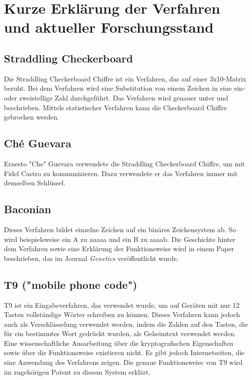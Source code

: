 \documentclass[fontsize=11pt, paper=a4, parskip=half]{scrartcl}
\begin{document}
\section{Kurze Erklärung der Verfahren und aktueller Forschungsstand}
\subsection{Straddling Checkerboard}
Die Straddling Checkerboard Chiffre ist ein Verfahren, das auf einer 3x10-Matrix beruht. Bei dem Verfahren wird eine Substitution von einem Zeichen in eine ein- oder zweistellige Zahl durchgeführt. Das Verfahren wird genauer unter \cite{Kuhlemann2020SpionageChiffreStraddlingCheckerboard} und \cite{Goebel2020TheRiseOfFieldCiphers} beschrieben. Mittels statistischer Verfahren kann die Checkerboard Chiffre gebrochen werden. \cite{Lyons2012CryptanalysisOfTheSimpleSubstitutionCipher}
\subsection{Ché Guevara}
Ernesto "Che" Guevara verwendete die Straddling Checkerboard Chiffre, um mit Fidel Castro zu kommunizieren. Dazu verwendete er das Verfahren immer mit demselben Schlüssel. \cite{Kuhlemann2020CheGuevaraChiffre}
\subsection{Baconian}
Dieses Verfahren bildet einzelne Zeichen auf ein binäres Zeichensystem ab. So wird beispielsweise ein A zu aaaaa und ein B zu aaaab. Die Geschichte hinter dem Verfahren sowie eine Erklärung der Funktionsweise wird in einem Paper beschrieben, das im Journal \textit{Genetics} veröffentlicht wurde.
\cite{Goldman2017WilliamFriedmanGeneticistTurnedCryptographer}
\subsection{T9 ("mobile phone code")}
T9 ist ein Eingabeverfahren, das verwendet wurde, um auf Geräten mit nur 12 Tasten vollständige Wörter schreiben zu können. Dieses Verfahren kann jedoch auch als Verschlüsselung verwendet werden, indem die Zahlen auf den Tasten, die für ein bestimmtes Wort gedrückt wurden, als Geheimtext verwendet werden. Eine wissenschaftliche Ausarbeitung über die kryptografischen Eigenschaften sowie über die Funktionsweise existieren nicht. Es gibt jedoch Internetseiten, die eine Anwendung des Verfahrens zeigen. \cite{unknown2020T9TextMessage} Die genaue Funktionsweise von T9 wird im zugehörigen Patent zu diesem System erklärt. \cite{groverKingKushler1998ReducedKeyboardDisambiguatingComputer}
\end{document}
